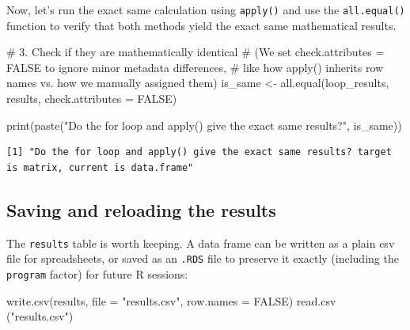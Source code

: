 \documentclass[
  letterpaper,
  DIV=11,
  numbers=noendperiod]{scrreprt}
\newenvironment{Shaded}{\begin{snugshade}}{\end{snugshade}}
\newcommand{\AttributeTok}[1]{\textcolor[rgb]{0.40,0.45,0.13}{#1}}
\newcommand{\CommentTok}[1]{\textcolor[rgb]{0.37,0.37,0.37}{#1}}
\newcommand{\ConstantTok}[1]{\textcolor[rgb]{0.56,0.35,0.01}{#1}}
\newcommand{\FunctionTok}[1]{\textcolor[rgb]{0.28,0.35,0.67}{#1}}
\newcommand{\NormalTok}[1]{\textcolor[rgb]{0.00,0.23,0.31}{#1}}
\newcommand{\OtherTok}[1]{\textcolor[rgb]{0.00,0.23,0.31}{#1}}
\newcommand{\StringTok}[1]{\textcolor[rgb]{0.13,0.47,0.30}{#1}}
\begin{document}
Now, let's run the exact same calculation using \texttt{apply()} and use
the \texttt{all.equal()} function to verify that both methods yield the
exact same mathematical results.

\begin{Shaded}
\begin{Highlighting}[]
\CommentTok{\# 3. Check if they are mathematically identical}
\CommentTok{\# (We set check.attributes = FALSE to ignore minor metadata differences, }
\CommentTok{\# like how apply() inherits row names vs. how we manually assigned them)}
\NormalTok{is\_same }\OtherTok{\textless{}{-}} \FunctionTok{all.equal}\NormalTok{(loop\_results, results, }\AttributeTok{check.attributes =} \ConstantTok{FALSE}\NormalTok{)}

\FunctionTok{print}\NormalTok{(}\FunctionTok{paste}\NormalTok{(}\StringTok{"Do the for loop and apply() give the exact same results?"}\NormalTok{, is\_same))}
\end{Highlighting}
\end{Shaded}

\begin{verbatim}
[1] "Do the for loop and apply() give the exact same results? target is matrix, current is data.frame"
\end{verbatim}

\subsection{Saving and reloading the
results}\label{saving-and-reloading-the-results}

The \texttt{results} table is worth keeping. A data frame can be written
as a plain csv file for spreadsheets, or saved as an \texttt{.RDS} file
to preserve it exactly (including the \texttt{program} factor) for
future R sessions:

\begin{Shaded}
\begin{Highlighting}[]
\FunctionTok{write.csv}\NormalTok{(results, }\AttributeTok{file =} \StringTok{"results.csv"}\NormalTok{, }\AttributeTok{row.names =} \ConstantTok{FALSE}\NormalTok{)}
\FunctionTok{read.csv}\NormalTok{ (}\StringTok{"results.csv"}\NormalTok{)}
\end{Highlighting}
\end{Shaded}
\end{document}
